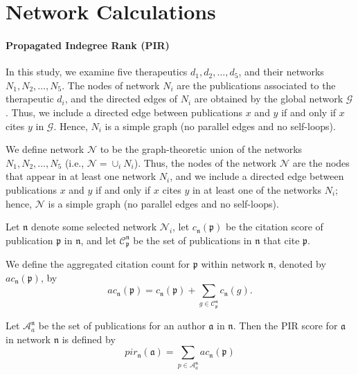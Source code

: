 \documentclass[12pt]{amsart}
\title{}
\author{}
\date{} %
\begin{document}
\section*{Network Calculations}

\vspace{.1in}

\paragraph{\textbf{Propagated Indegree Rank (PIR)}} 
In this study, we examine five therapeutics $d_1, d_2, \ldots, d_5$, and their networks $N_1, N_2, \ldots, N_5$.
The nodes of network $N_i$ are the publications associated to the therapeutic $d_i$, and the directed edges of $N_i$ are
obtained by the global network $\mathcal{G}$. Thus, we include a directed
edge between publications $x$ and $y$ if  and only if $x$ cites $y$  in $\mathcal{G}$. Hence, 
$N_i$ is a simple graph (no parallel edges and no self-loops).


We define  network $\mathcal{N}$ to be the graph-theoretic union of the
networks $N_1, N_2, \ldots, N_5$ (i.e., $\mathcal{N} =\cup_i N_i$). Thus, the nodes of the
network $\mathcal{N}$ are the nodes that appear in at least one network $N_i$, and we include a directed
edge between publications $x$ and $y$ if  and only if $x$ cites $y$ in at least one of the networks $N_i$; hence, 
$\mathcal{N}$ is a simple graph (no parallel edges and no self-loops).

Let $\mathfrak{n}$ denote some selected network $\mathcal{N}_i$, 
let $c_{\mathfrak{n}}(\mathfrak{p})$ be the citation score of publication $\mathfrak{p}$ in  $\mathfrak{n}$, and let $\mathcal{C}_\mathfrak{p}^\mathfrak{n}$ be the set of publications in $\mathfrak{\mathfrak{n}}$ that cite $\mathfrak{p}$. 

We define the aggregated citation count for  $\mathfrak{p}$ within network $\mathfrak{\mathfrak{n}}$, denoted by  $ac_{\mathfrak{n}}(\mathfrak{p})$, by
$$ ac_{\mathfrak{n}}(\mathfrak{p}) = c_{\mathfrak{n}}(\mathfrak{p}) + \sum_{g\in \mathcal{C}_\mathfrak{p}^\mathfrak{n}}  c_{\mathfrak{n}}(g).$$

Let $\mathcal{A}_a^{\mathfrak{n}}$ be the set of publications for an author $\mathfrak{a}$ in  $\mathfrak{\mathfrak{n}}$. Then the PIR score  for  $\mathfrak{a}$  in network $\mathfrak{n}$ is defined by $$ pir_{\mathfrak{n}}(\mathfrak{a}) =  \sum_{p\in \mathcal{A}_a^{\mathfrak{n}}}  ac_{\mathfrak{n}}(\mathfrak{p}) $$ 
\end{document}
